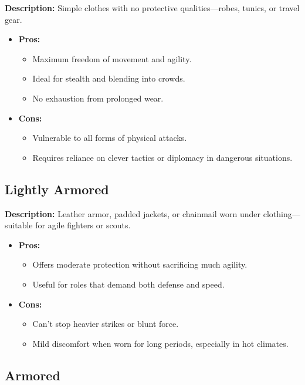 \textbf{Description:} Simple clothes with no protective qualities—robes, tunics, or travel gear.

\begin{itemize}
    \item \textbf{Pros:}
    \begin{itemize}
        \item Maximum freedom of movement and agility.
        \item Ideal for stealth and blending into crowds.
        \item No exhaustion from prolonged wear.
    \end{itemize}
    \item \textbf{Cons:}
    \begin{itemize}
        \item Vulnerable to all forms of physical attacks.
        \item Requires reliance on clever tactics or diplomacy in dangerous situations.
    \end{itemize}
\end{itemize}

\subsection*{Lightly Armored}

\textbf{Description:} Leather armor, padded jackets, or chainmail worn under clothing—suitable for agile fighters or scouts.

\begin{itemize}
    \item \textbf{Pros:}
    \begin{itemize}
        \item Offers moderate protection without sacrificing much agility.
        \item Useful for roles that demand both defense and speed.
    \end{itemize}
    \item \textbf{Cons:}
    \begin{itemize}
        \item Can’t stop heavier strikes or blunt force.
        \item Mild discomfort when worn for long periods, especially in hot climates.
    \end{itemize}
\end{itemize}

\subsection*{Armored}

